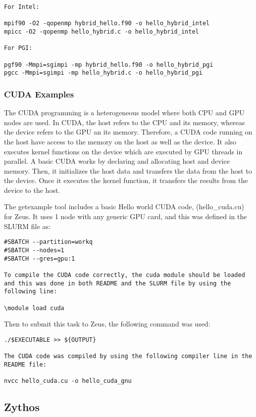 \documentclass[journal]{IEEEtran}
\begin{document}
{\begin{verbatim}
For Intel:

mpif90 -O2 -qopenmp hybrid_hello.f90 -o hello_hybrid_intel
mpicc -O2 -qopenmp hello_hybrid.c -o hello_hybrid_intel

For PGI:

pgf90 -Mmpi=sgimpi -mp hybrid_hello.f90 -o hello_hybrid_pgi
pgcc -Mmpi=sgimpi -mp hello_hybrid.c -o hello_hybrid_pgi
\end{verbatim}

\subsubsection{CUDA Examples}

The CUDA programming is a heterogeneous model where both CPU and GPU nodes are used. In CUDA, the host refers to the CPU and its memory, whereas the 
device refers to the GPU an its memory. Therefore, a CUDA code running on the host have access to the memory on the host as well as the device. It also 
executes kernel functions on the device which are executed by GPU threads in parallel. A basic CUDA works by declaring and allocating host and device 
memory. Then, it initializes the host data and transfers the data from the host to the device. Once it executes the kernel function, it transfers the 
results from the device to the host.

The getexample tool includes a basic Hello world CUDA code, (hello_cuda.cu) for Zeus. It uses 1 node with any generic GPU card, and this was defined in the 
SLURM file as:

\begin{verbatim}
#SBATCH --partition=workq
#SBATCH --nodes=1
#SBATCH --gres=gpu:1

To compile the CUDA code correctly, the cuda module should be loaded and this was done in both README and the SLURM file by using the following line:

\module load cuda
\end{verbatim}

Then to submit this task to Zeus, the following command was used:

\begin{verbatim}
./$EXECUTABLE >> ${OUTPUT}

The CUDA code was compiled by using the following compiler line in the README file:

nvcc hello_cuda.cu -o hello_cuda_gnu
\end{verbatim} 
  
\subsection{Zythos}

}
\end{document}
